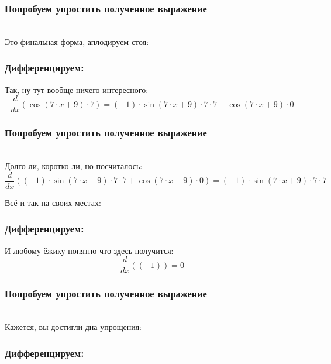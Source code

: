 \documentclass[a4paper,12pt]{article}
\begin{document}
\subsubsection*{Попробуем упростить полученное выражение}
\\Это финальная форма, аплодируем стоя:

\subsubsection*{Дифференцируем:}

Так, ну тут вообще ничего интересного:
\begin{dmath}\frac{d}{dx}\left(\operatorname{cos}\left(7\cdot x+ 9\right) \cdot 7\right)=(-1)\cdot \operatorname{sin}\left(7\cdot x+ 9\right) \cdot 7\cdot 7+ \operatorname{cos}\left(7\cdot x+ 9\right) \cdot 0\end{dmath}
\subsubsection*{Попробуем упростить полученное выражение}
\\Долго ли, коротко ли, но посчиталось:\\
\begin{dmath}
	\frac{d}{dx}\left((-1)\cdot \operatorname{sin}\left(7\cdot x+ 9\right) \cdot 7\cdot 7+ \operatorname{cos}\left(7\cdot x+ 9\right) \cdot 0\right) = (-1)\cdot \operatorname{sin}\left(7\cdot x+ 9\right) \cdot 7\cdot 7\end{dmath}

Всё и так на своих местах:

\subsubsection*{Дифференцируем:}

И любому ёжику понятно что здесь получится:
\begin{dmath}\frac{d}{dx}\left((-1)\right)=0\end{dmath}
\subsubsection*{Попробуем упростить полученное выражение}
\\Кажется, вы достигли дна упрощения:

\subsubsection*{Дифференцируем:}
\end{document}
